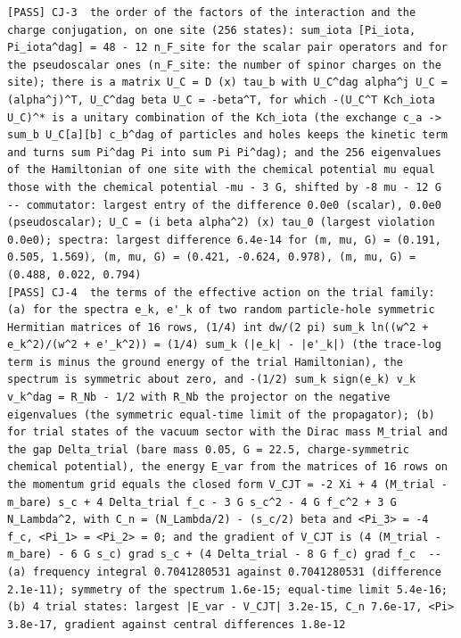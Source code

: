 \documentclass[
  10pt,
]{article}
\begin{document}
\begin{verbatim}
[PASS] CJ-3  the order of the factors of the interaction and the charge conjugation, on one site (256 states): sum_iota [Pi_iota, Pi_iota^dag] = 48 - 12 n_F_site for the scalar pair operators and for the pseudoscalar ones (n_F_site: the number of spinor charges on the site); there is a matrix U_C = D (x) tau_b with U_C^dag alpha^j U_C = (alpha^j)^T, U_C^dag beta U_C = -beta^T, for which -(U_C^T Kch_iota U_C)^* is a unitary combination of the Kch_iota (the exchange c_a -> sum_b U_C[a][b] c_b^dag of particles and holes keeps the kinetic term and turns sum Pi^dag Pi into sum Pi Pi^dag); and the 256 eigenvalues of the Hamiltonian of one site with the chemical potential mu equal those with the chemical potential -mu - 3 G, shifted by -8 mu - 12 G  -- commutator: largest entry of the difference 0.0e0 (scalar), 0.0e0 (pseudoscalar); U_C = (i beta alpha^2) (x) tau_0 (largest violation 0.0e0); spectra: largest difference 6.4e-14 for (m, mu, G) = (0.191, 0.505, 1.569), (m, mu, G) = (0.421, -0.624, 0.978), (m, mu, G) = (0.488, 0.022, 0.794)
[PASS] CJ-4  the terms of the effective action on the trial family: (a) for the spectra e_k, e'_k of two random particle-hole symmetric Hermitian matrices of 16 rows, (1/4) int dw/(2 pi) sum_k ln((w^2 + e_k^2)/(w^2 + e'_k^2)) = (1/4) sum_k (|e_k| - |e'_k|) (the trace-log term is minus the ground energy of the trial Hamiltonian), the spectrum is symmetric about zero, and -(1/2) sum_k sign(e_k) v_k v_k^dag = R_Nb - 1/2 with R_Nb the projector on the negative eigenvalues (the symmetric equal-time limit of the propagator); (b) for trial states of the vacuum sector with the Dirac mass M_trial and the gap Delta_trial (bare mass 0.05, G = 22.5, charge-symmetric chemical potential), the energy E_var from the matrices of 16 rows on the momentum grid equals the closed form V_CJT = -2 Xi + 4 (M_trial - m_bare) s_c + 4 Delta_trial f_c - 3 G s_c^2 - 4 G f_c^2 + 3 G N_Lambda^2, with C_n = (N_Lambda/2) - (s_c/2) beta and <Pi_3> = -4 f_c, <Pi_1> = <Pi_2> = 0; and the gradient of V_CJT is (4 (M_trial - m_bare) - 6 G s_c) grad s_c + (4 Delta_trial - 8 G f_c) grad f_c  -- (a) frequency integral 0.7041280531 against 0.7041280531 (difference 2.1e-11); symmetry of the spectrum 1.6e-15; equal-time limit 5.4e-16; (b) 4 trial states: largest |E_var - V_CJT| 3.2e-15, C_n 7.6e-17, <Pi> 3.8e-17, gradient against central differences 1.8e-12

\end{verbatim}
\end{document}
